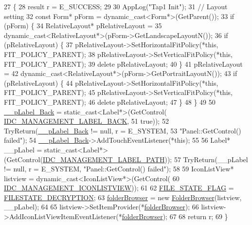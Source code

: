 \begin{DoxyCode}
27                                        \{
28     result r = E\_SUCCESS;
29 
30     AppLog(\textcolor{stringliteral}{"Tap1 Init"});
31     \textcolor{comment}{// Layout setting}
32     \textcolor{keyword}{const} Form* pForm = \textcolor{keyword}{dynamic\_cast<}Form*\textcolor{keyword}{>}(GetParent());
33     \textcolor{keywordflow}{if} (pForm) \{
34         RelativeLayout* pRelativeLayout =
35                 \textcolor{keyword}{dynamic\_cast<}RelativeLayout*\textcolor{keyword}{>}(pForm->GetLandscapeLayoutN());
36         \textcolor{keywordflow}{if} (pRelativeLayout) \{
37             pRelativeLayout->SetHorizontalFitPolicy(*\textcolor{keyword}{this}, FIT\_POLICY\_PARENT);
38             pRelativeLayout->SetVerticalFitPolicy(*\textcolor{keyword}{this}, FIT\_POLICY\_PARENT);
39             \textcolor{keyword}{delete} pRelativeLayout;
40         \}
41         pRelativeLayout =
42                 \textcolor{keyword}{dynamic\_cast<}RelativeLayout*\textcolor{keyword}{>}(pForm->GetPortraitLayoutN());
43         \textcolor{keywordflow}{if} (pRelativeLayout) \{
44             pRelativeLayout->SetHorizontalFitPolicy(*\textcolor{keyword}{this}, FIT\_POLICY\_PARENT);
45             pRelativeLayout->SetVerticalFitPolicy(*\textcolor{keyword}{this}, FIT\_POLICY\_PARENT);
46             \textcolor{keyword}{delete} pRelativeLayout;
47         \}
48     \}
49 
50     \hyperlink{class_browser_tab1_ad072e2bcaa2a03d684ddfddd0d8dea77}{\_\_pLabel\_Back} = \textcolor{keyword}{static\_cast<}Label*\textcolor{keyword}{>}(GetControl(
      \hyperlink{_app_resource_id_8h_a69e9f116d4b974589b52a26093383d51}{IDC\_MANAGEMENT\_LABEL\_BACK},
51             \textcolor{keyword}{true}));
52     TryReturn(\hyperlink{class_browser_tab1_ad072e2bcaa2a03d684ddfddd0d8dea77}{\_\_pLabel\_Back} != null, r = E\_SYSTEM,
53             \textcolor{stringliteral}{"Panel::GetControl() failed"});
54     \hyperlink{class_browser_tab1_ad072e2bcaa2a03d684ddfddd0d8dea77}{\_\_pLabel\_Back}->AddTouchEventListener(*\textcolor{keyword}{this});
55 
56     Label* \_\_pLabel = \textcolor{keyword}{static\_cast<}Label*\textcolor{keyword}{>}(GetControl(\hyperlink{_app_resource_id_8h_aff978e851509c8ab30559a21d28a39eb}{IDC\_MANAGEMENT\_LABEL\_PATH}));
57     TryReturn(\_\_pLabel != null, r = E\_SYSTEM, \textcolor{stringliteral}{"Panel::GetControl() failed"});
58 
59     IconListView* listview = \textcolor{keyword}{dynamic\_cast<}IconListView*\textcolor{keyword}{>}(GetControl(
60             \hyperlink{_app_resource_id_8h_a82840bfda372ae82da0138a97f7e9783}{IDC\_MANAGEMENT\_ICONLISTVIEW}));
61 
62     \hyperlink{_list_view_item_popup_8h_a514e8b025bf71e7b0500f6f8efb635ce}{FILE\_STATE\_FLAG} = \hyperlink{_list_view_item_popup_8h_a2a28b5538cf5c338159be2e1c420261e}{FILESTATE\_DECRYPTION};
63     \hyperlink{class_browser_tab1_a2a514b5068c1222055a103c67abeeb2a}{folderBrowser} = \textcolor{keyword}{new} \hyperlink{class_folder_browser}{FolderBrowser}(listview, \_\_pLabel);
64 
65     listview->SetItemProvider(*\hyperlink{class_browser_tab1_a2a514b5068c1222055a103c67abeeb2a}{folderBrowser});
66     listview->AddIconListViewItemEventListener(*\hyperlink{class_browser_tab1_a2a514b5068c1222055a103c67abeeb2a}{folderBrowser});
67 
68     \textcolor{keywordflow}{return} r;
69 \}
\end{DoxyCode}
